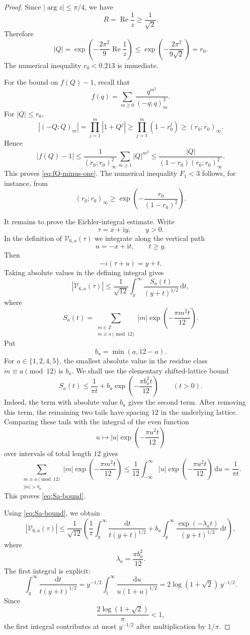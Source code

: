 \documentclass[10pt,a4paper]{amsart}
\newcommand{\ii}{\mathrm i}
\newcommand{\dd}{\mathrm d}
\newcommand{\Repart}{\operatorname{Re}}
\begin{document}
\begin{proof}
Since $|\arg z|\leq\pi/4$, we have
\[
R=\Repart\frac1z\geq\frac1{\sqrt2}.
\]
Therefore
\[
|Q|=\exp\left(-\frac{2\pi^2}{9}\Repart\frac1z\right)
\leq
\exp\left(-\frac{2\pi^2}{9\sqrt2}\right)=r_0.
\]
The numerical inequality $r_0<0.213$ is immediate.

For the bound on $f(Q)-1$, recall that
\[
f(q)=\sum_{m\geq0}\frac{q^{m^2}}{(-q;q)_m^2}.
\]
For $|Q|\leq r_0$,
\[
|(-Q;Q)_m|
=
\prod_{j=1}^{m}|1+Q^j|
\geq
\prod_{j=1}^{m}(1-r_0^j)
\geq
(r_0;r_0)_\infty.
\]
Hence
\[
|f(Q)-1|
\leq
\frac1{(r_0;r_0)_\infty^2}
\sum_{m\geq1}|Q|^{m^2}
\leq
\frac{|Q|}{(1-r_0)(r_0;r_0)_\infty^2}.
\]
This proves \eqref{eq:fQ-minus-one}.  The numerical inequality $F_1<3$ follows, for instance, from
\[
(r_0;r_0)_\infty
\geq
\exp\left(-\frac{r_0}{(1-r_0)^2}\right).
\]

It remains to prove the Eichler-integral estimate.  Write
\[
\tau=x+\ii y,
\qquad y>0.
\]
In the definition of $\mathcal V_{6,a}(\tau)$ we integrate along the vertical path
\[
u=-x+\ii t,
\qquad t\geq y.
\]
Then
\[
-i(\tau+u)=y+t.
\]
Taking absolute values in the defining integral gives
\[
|\mathcal V_{6,a}(\tau)|
\leq
\frac1{\sqrt{12}}
\int_y^\infty \frac{S_a(t)}{(y+t)^{1/2}}\,\dd t,
\]
where
\[
S_a(t)
=
\sum_{\substack{m\in\mathbb Z\\ m\equiv a\pmod{12}}}
|m|\exp\left(-\frac{\pi m^2t}{12}\right).
\]
Put
\[
b_a=\min(a,12-a).
\]
For $a\in\{1,2,4,5\}$, the smallest absolute value in the residue class
$m\equiv a\pmod {12}$ is $b_a$.  We shall use the elementary shifted-lattice bound
\begin{equation}\label{eq:Sa-bound}
S_a(t)
\leq
\frac1{\pi t}
+
b_a\exp\left(-\frac{\pi b_a^2t}{12}\right)
\qquad(t>0).
\end{equation}
Indeed, the term with absolute value $b_a$ gives the second term.  After removing this term, the remaining two tails have spacing $12$ in the underlying lattice.  Comparing these tails with the integral of the even function
\[
u\mapsto |u|\exp\left(-\frac{\pi u^2t}{12}\right)
\]
over intervals of total length $12$ gives
\[
\sum_{\substack{m\equiv a\pmod{12}\\ |m|>b_a}}
|m|\exp\left(-\frac{\pi m^2t}{12}\right)
\leq
\frac1{12}\int_{-\infty}^{\infty}
|u|\exp\left(-\frac{\pi u^2t}{12}\right)\,\dd u
=
\frac1{\pi t}.
\]
This proves \eqref{eq:Sa-bound}.

Using \eqref{eq:Sa-bound}, we obtain
\[
|\mathcal V_{6,a}(\tau)|
\leq
\frac1{\sqrt{12}}
\left(
\frac1\pi
\int_y^\infty \frac{\dd t}{t(y+t)^{1/2}}
+
b_a\int_y^\infty
\frac{\exp(-\lambda_a t)}{(y+t)^{1/2}}\,\dd t
\right),
\]
where
\[
\lambda_a=\frac{\pi b_a^2}{12}.
\]
The first integral is explicit:
\[
\int_y^\infty \frac{\dd t}{t(y+t)^{1/2}}
=
y^{-1/2}
\int_1^\infty \frac{\dd u}{u(1+u)^{1/2}}
=
2\log(1+\sqrt2)\,y^{-1/2}.
\]
Since
\[
\frac{2\log(1+\sqrt2)}{\pi}<1,
\]
the first integral contributes at most $y^{-1/2}$ after multiplication by $1/\pi$.


\end{proof}
\end{document}
